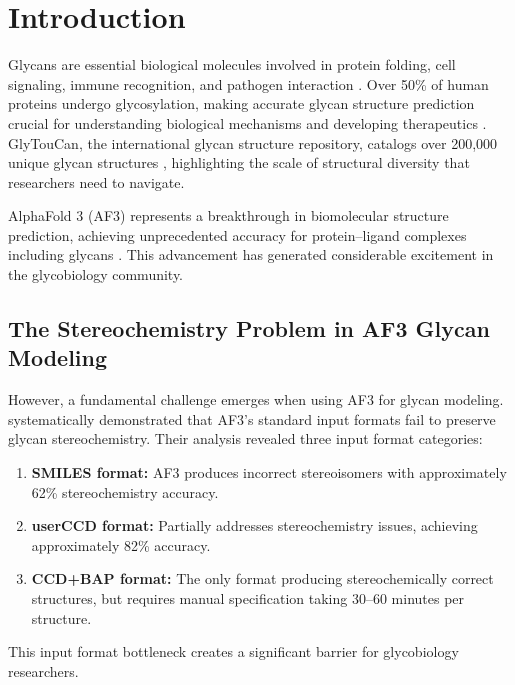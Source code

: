 \section{Introduction}

Glycans are essential biological molecules involved in protein folding, cell signaling, immune recognition, and pathogen interaction \citep{varki2017}. Over 50\% of human proteins undergo glycosylation, making accurate glycan structure prediction crucial for understanding biological mechanisms and developing therapeutics \citep{helenius2004}. GlyTouCan, the international glycan structure repository, catalogs over 200,000 unique glycan structures \citep{tiemeyer2016}, highlighting the scale of structural diversity that researchers need to navigate.

AlphaFold 3 (AF3) represents a breakthrough in biomolecular structure prediction, achieving unprecedented accuracy for protein--ligand complexes including glycans \citep{abramson2024}. This advancement has generated considerable excitement in the glycobiology community.

\subsection{The Stereochemistry Problem in AF3 Glycan Modeling}

However, a fundamental challenge emerges when using AF3 for glycan modeling. \citet{huang2025} systematically demonstrated that AF3's standard input formats fail to preserve glycan stereochemistry. Their analysis revealed three input format categories:

\begin{enumerate}
\item \textbf{SMILES format:} AF3 produces incorrect stereoisomers with approximately 62\% stereochemistry accuracy.
\item \textbf{userCCD format:} Partially addresses stereochemistry issues, achieving approximately 82\% accuracy.
\item \textbf{CCD+BAP format:} The only format producing stereochemically correct structures, but requires manual specification taking 30--60 minutes per structure.
\end{enumerate}

This input format bottleneck creates a significant barrier for glycobiology researchers.
